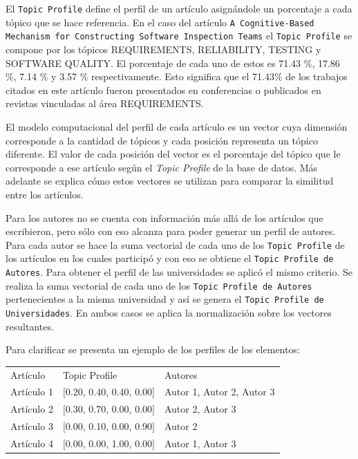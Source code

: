 El \texttt{Topic Profile} define el perfil de un artículo asignándole un porcentaje a cada tópico que se hace referencia. En el caso del artículo \texttt{A Cognitive-Based Mechanism for Constructing Software Inspection Teams} el \texttt{Topic Profile} se compone por los tópicos  REQUIREMENTS, RELIABILITY, TESTING y SOFTWARE QUALITY. El porcentaje de cada uno de estos es 71.43 \%, 17.86 \%, 7.14 \% y 3.57 \% respectivamente. Esto significa que el 71.43\% de los trabajos citados en este artículo fueron presentados en conferencias o publicados en revistas vinculadas al área REQUIREMENTS.

El modelo computacional del perfil de cada artículo es un vector cuya dimensión corresponde a la cantidad de tópicos y cada posición representa un tópico diferente. El valor de cada posición del vector es el porcentaje del tópico que le corresponde a ese artículo según el \textit{Topic Profile} de la base de datos. Más adelante se explica cómo estos vectores se utilizan para comparar la similitud entre los artículos.

Para los autores no se cuenta con información más allá de los artículos que escribieron, pero sólo con eso alcanza para poder generar un perfil de autores. Para cada autor se hace la suma vectorial de cada uno de los \texttt{Topic Profile} de los artículos en los cuales participó y con eso se obtiene el \texttt{Topic Profile de Autores}. Para obtener el perfil de las universidades se aplicó el mismo criterio. Se realiza la suma vectorial de cada uno de los \texttt{Topic Profile de Autores} pertenecientes a la misma universidad y así se genera el \texttt{Topic Profile de Universidades}. En ambos casos se aplica la normalización sobre los vectores resultantes.

Para clarificar se presenta un ejemplo de los perfiles de los elementos:

\begin{table}[H]
\begin{tabular}{lll}
	Artículo & Topic Profile & Autores \\
	Artículo 1 & $[$0.20, 0.40, 0.40, 0.00$]$ & Autor 1, Autor 2, Autor 3 \\
	Artículo 2 & $[$0.30, 0.70, 0.00, 0.00$]$ & Autor 2, Autor 3 \\
	Artículo 3 & $[$0.00, 0.10, 0.00, 0.90$]$ & Autor 2 \\
	Artículo 4 & $[$0.00, 0.00, 1.00, 0.00$]$ & Autor 1, Autor 3 \\
\end{tabular}
\label{tabla:topicProfileEj1}
\end{table}

